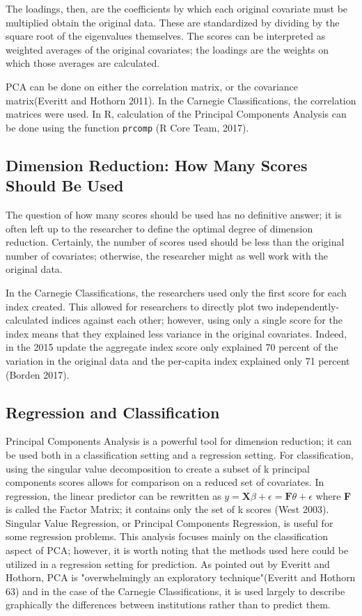 \documentclass{article}
\begin{document}
The loadings, then, are the coefficients by which each original covariate must be multiplied obtain the original data. These are standardized by dividing by the square root of the eigenvalues themselves. The scores can be interpreted as weighted averages of the original covariates; the loadings are the weights on which those averages are calculated. 

PCA can be done on either the correlation matrix, or the covariance matrix(Everitt and Hothorn 2011). In the Carnegie Classifications, the correlation matrices were used. In R, calculation of the Principal Components Analysis can be done using the function \texttt {prcomp} (R Core Team, 2017).  

\subsection{Dimension Reduction: How Many Scores Should Be Used}
The question of how many scores should be used has no definitive answer; it is often left up to the researcher to define the optimal degree of dimension reduction. Certainly, the number of scores used should be less than the original number of covariates; otherwise, the researcher might as well work with the original data. 

In the Carnegie Classifications, the researchers used only the first score for each index created. This allowed for researchers to directly plot two independently-calculated indices against each other; however, using only a single score for the index means that they explained less variance in the original covariates. Indeed, in the 2015 update the aggregate index score only explained 70 percent of the variation in the original data and the per-capita index explained only 71 percent (Borden 2017).  


\subsection{Regression and Classification}
Principal Components Analysis is a powerful tool for dimension reduction; it can be used both in a classification setting and a regression setting. For classification, using the singular value decomposition to create a subset of k principal components scores allows for comparison on a reduced set of covariates. In regression, the linear predictor can be rewritten as $y = \textbf{X} \beta + \epsilon = \textbf{F}\theta + \epsilon$ where \textbf{F} is called the Factor Matrix; it contains only the set of k scores (West 2003). Singular Value Regression, or Principal Components Regression, is useful for some regression problems.  This analysis focuses mainly on the classification aspect of PCA; however, it is worth noting that the methods used here could be utilized in a regression setting for prediction. As pointed out by Everitt and Hothorn, PCA is "overwhelmingly an exploratory technique"(Everitt and Hothorn 63) and in the case of the Carnegie Classifications, it is used largely to describe graphically the differences between institutions rather than to predict them. 
\pagebreak
\end{document}
